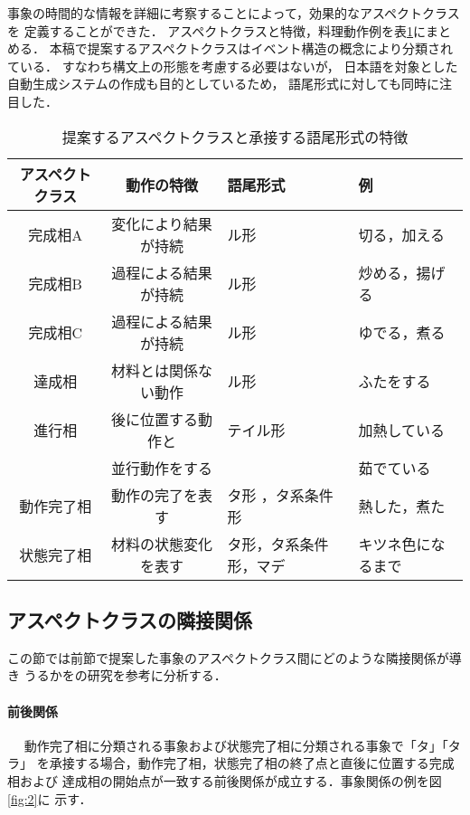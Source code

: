 事象の時間的な情報を詳細に考察することによって，効果的なアスペクトクラスを
定義することができた．
アスペクトクラスと特徴，料理動作例を表\ref{tab:8}にまとめる．
本稿で提案するアスペクトクラスはイベント構造の概念により分類されている．
すなわち構文上の形態を考慮する必要はないが，
日本語を対象とした自動生成システムの作成も目的としているため，
語尾形式に対しても同時に注目した．

\begin{table}[ht]
\begin{center}
\caption{提案するアスペクトクラスと承接する語尾形式の特徴}\label{tab:8}
   \begin{tabular}{|c|c|l|l|} \hline
 アスペクトクラス & 動作の特徴 & 語尾形式           & 例\\ \hline\hline
 完成相A          & 変化により結果が持続 & ル形     & 切る，加える\\          
 完成相B          & 過程による結果が持続 & ル形     & 炒める，揚げる \\ 
 完成相C          & 過程による結果が持続 & ル形     & ゆでる，煮る \\ \hline
 達成相           & 材料とは関係ない動作 & ル形     & ふたをする \\ \hline     
 進行相           & 後に位置する動作と & テイル形   & 加熱している \\
                  & 並行動作をする     &            & 茹でている \\ \hline
 動作完了相       & 動作の完了を表す   & タ形 ，タ系条件形 & 熱した，煮た \\  
 状態完了相       & 材料の状態変化を表す & タ形，タ系条件形，マデ  & キツネ色になるまで\\ \hline
\end{tabular} 
\end{center}
\end{table}


\subsection{アスペクトクラスの隣接関係}

この節では前節で提案した事象のアスペクトクラス間にどのような隣接関係が導き
うるかを\cite{yoav}の研究を参考に分析する．

\paragraph{前後関係}~~
動作完了相に分類される事象および状態完了相に分類される事象で「タ」「タラ」
を承接する場合，動作完了相，状態完了相の終了点と直後に位置する完成相および
達成相の開始点が一致する前後関係が成立する．事象関係の例を図\ref{fig:2}に
示す．

